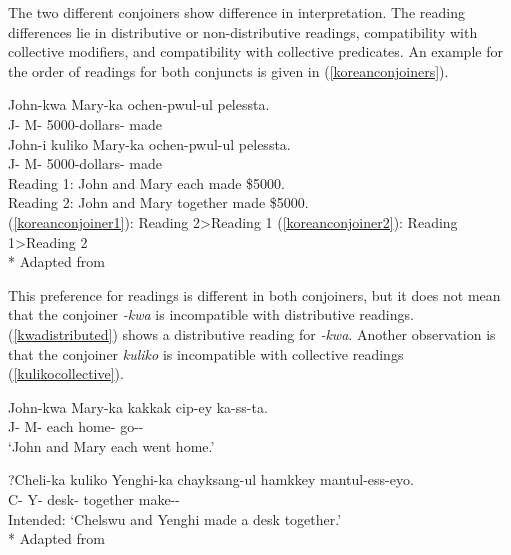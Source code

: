 The two different conjoiners show difference in interpretation. The reading differences lie in distributive or non-distributive readings, compatibility with collective modifiers, and compatibility with collective predicates. An example for the order of readings for both conjuncts is given in (\ref{koreanconjoiners}).

\begin{exe}
    \ex \label{koreanconjoiners}
    \begin{xlist}
        \ex \label{koreanconjoiner1} 
        \gll John-kwa Mary-ka ochen-pwul-ul pelessta. \\ 
        J-{\And} M-{\Nom} 5000-dollars-{\Acc} made \\
        
        \ex \label{koreanconjoiner2}
        \gll John-i kuliko Mary-ka ochen-pwul-ul pelessta. \\ 
        J-{\Nom} {\And} M-{\Nom} 5000-dollars-{\Acc} made \\
        \glt Reading 1: John and Mary each made \$5000. \\
        Reading 2: John and Mary together made \$5000. \\
        (\ref{koreanconjoiner1}): Reading 2\textgreater Reading 1 (\ref{koreanconjoiner2}): Reading 1\textgreater Reading 2\\*
        \hfill Adapted from \citet{yoon2005conjunction}
    \end{xlist}
\end{exe}

This preference for readings is different in both conjoiners, but it does not mean that the conjoiner \textit{-kwa} is incompatible with distributive readings. (\ref{kwadistributed}) shows a distributive reading for \textit{-kwa}. Another observation is that the conjoiner \textit{kuliko} is incompatible with collective readings (\ref{kulikocollective}).

\begin{exe}
    \ex \begin{xlist}
    \ex \label{kwadistributed}
    \gll John-kwa Mary-ka kakkak cip-ey ka-ss-ta. \\ 
    J-{\And} M-{\Nom} each home-{\Loc} go-{\Pst}-{\Decl} \\
    \glt `John and Mary each went home.'
    
    \ex \label{kulikocollective}
    \gll *?Cheli-ka kuliko Yenghi-ka chayksang-ul hamkkey mantul-ess-eyo. \\
    C-{\Nom} {\And} Y-{\Nom} desk-{\Acc} together make-{\Pst}-{\Decl} \\
    \glt Intended: `Chelswu and Yenghi made a desk together.'\\*
    \hfill Adapted from \citet{yoon2005conjunction}
    \end{xlist}
 \end{exe}

